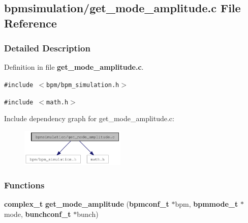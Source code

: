 \subsection{bpmsimulation/get\_\-mode\_\-amplitude.c File Reference}
\label{get__mode__amplitude_8c}


\subsubsection{Detailed Description}


Definition in file {\bf get\_\-mode\_\-amplitude.c}.

{\tt \#include $<$bpm/bpm\_\-simulation.h$>$}\par
{\tt \#include $<$math.h$>$}\par


Include dependency graph for get\_\-mode\_\-amplitude.c:\nopagebreak
\begin{figure}[H]
\begin{center}
\leavevmode
\includegraphics[width=142pt]{get__mode__amplitude_8c__incl}
\end{center}
\end{figure}
\subsubsection*{Functions}
\begin{CompactItemize}
\item 
{\bf complex\_\-t} {\bf get\_\-mode\_\-amplitude} ({\bf bpmconf\_\-t} $\ast$bpm, {\bf bpmmode\_\-t} $\ast$mode, {\bf bunchconf\_\-t} $\ast$bunch)
\end{CompactItemize}
